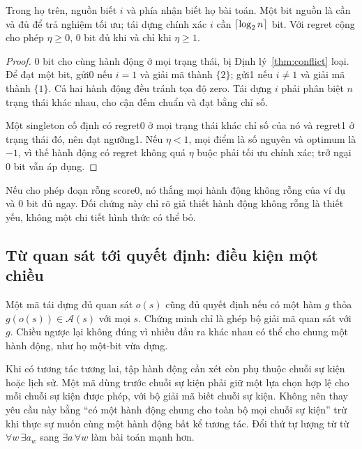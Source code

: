 \begin{corollary}\label{cor:onebit}
Trong họ trên, nguồn biết $i$ và phía nhận biết họ bài toán. Một bit nguồn là cần và đủ để trả nghiệm tối ưu; tái dựng chính xác $i$ cần $\left\lceil \log_2n\right\rceil$ bit. Với regret cộng cho phép $\eta\ge0$, 0 bit đủ khi và chỉ khi $\eta\ge1$.
\end{corollary}
\begin{proof}
0 bit cho cùng hành động ở mọi trạng thái, bị Định lý~\ref{thm:conflict} loại. Để đạt một bit, gửi0 nếu $i=1$ và giải mã thành $\{2\}$; gửi1 nếu $i\ne1$ và giải mã thành $\{1\}$. Cả hai hành động đều tránh tọa độ zero. Tái dựng $i$ phải phân biệt $n$ trạng thái khác nhau, cho cận đếm chuẩn và đạt bằng chỉ số.

Một singleton cố định có regret0 ở mọi trạng thái khác chỉ số của nó và regret1 ở trạng thái đó, nên đạt ngưỡng1. Nếu $\eta<1$, mọi điểm là số nguyên và optimum là $-1$, vì thế hành động có regret không quá $\eta$ buộc phải tối ưu chính xác; trở ngại 0 bit vẫn áp dụng.
\end{proof}
Nếu cho phép đoạn rỗng score0, nó thắng mọi hành động không rỗng của ví dụ và 0 bit đủ ngay. Đối chứng này chỉ rõ giả thiết hành động không rỗng là thiết yếu, không một chi tiết hình thức có thể bỏ.

\subsection{Từ quan sát tới quyết định: điều kiện một chiều}
Một mã tái dựng đủ quan sát $o(s)$ cũng đủ quyết định nếu có một hàm $g$ thỏa $g(o(s))\in\mathcal A(s)$ với mọi $s$. Chứng minh chỉ là ghép bộ giải mã quan sát với $g$. Chiều ngược lại không đúng vì nhiều đầu ra khác nhau có thể cho chung một hành động, như họ một-bit vừa dựng.

Khi có tương tác tương lai, tập hành động cần xét còn phụ thuộc chuỗi sự kiện hoặc lịch sử. Một mã dùng trước chuỗi sự kiện phải giữ một lựa chọn hợp lệ cho mỗi chuỗi sự kiện được phép, với bộ giải mã biết chuỗi sự kiện. Không nên thay yêu cầu này bằng ``có một hành động chung cho toàn bộ mọi chuỗi sự kiện'' trừ khi thực sự muốn cùng một hành động bất kể tương tác. Đổi thứ tự lượng từ từ $\forall w\,\exists a_w$ sang $\exists a\,\forall w$ làm bài toán mạnh hơn.
